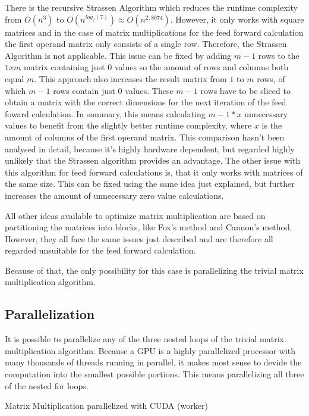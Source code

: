 \documentclass[sigconf]{acmart}
\begin{document}
There is the recursive Strassen Algorithm which reduces the runtime complexity from $O(n^3)$ to $O(n^{log_2(7)})\approx O(n^{2,8074})$.
However, it only works with square matrices and in the case of matrix multiplications for the feed forward calculation the first
operand matrix only consists of a single row. 
Therefore, the Strassen Algorithm is not applicable. This issue can be fixed by adding $m-1$ rows to the $1xm$ matrix
containing just 0 values so the amount of rows and columns both equal $m$. This approach also increases the result matrix from
$1$ to $m$ rows, of which $m-1$ rows contain just 0 values. These $m-1$ rows have to be sliced 
to obtain a matrix with the correct dimensions for the next iteration of the feed foward calculation.
In summary, this means calculating $m-1 * x$ unnecessary values to benefit from the slightly better runtime complexity,
where $x$ is the amount of columns of the first operand matrix.
This comparison hasn't been analysed in detail, because it's highly hardware dependent, but regarded highly unlikely that the Strassen algorithm provides an advantage.
The other issue with this algorithm for feed forward calculations is, that it only works with matrices of the same size.
This can be fixed using the same idea just explained, but further increases the amount of unnecessary zero value calculations.

All other ideas available to optimize matrix multiplication are based on partitioning the matrices into blocks, like Fox's method and Cannon's method.
However, they all face the same issues just described and are therefore all regarded unsuitable for the feed forward calculation.

Because of that, the only possibility for this case is parallelizing the trivial matrix multiplication algorithm.

\subsection{Parallelization}
It is possible to parallelize any of the three nested loops of the trivial matrix multiplication algorithm.
Because a GPU is a highly parallelized processor with many thousands of threads running in parallel, it makes 
most sense to devide the computation into the smallest possible portions. This means parallelizing all three of
the nested for loops.
\

\begin{algorithm}[]
    \caption{Matrix Multiplication parallelized with CUDA (worker)}
    \begin{algorithmic}[2]
        \EndFor
    \EndProcedure
    \end{algorithmic}
\end{algorithm}
\end{document}
